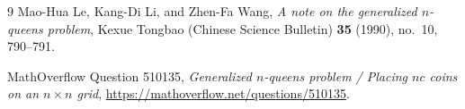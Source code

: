 \documentclass[11pt,a4paper]{article}
\theoremstyle{remark}
\begin{document}
\begin{thebibliography}{9}
Mao-Hua Le, Kang-Di Li, and Zhen-Fa Wang,
\emph{A note on the generalized $n$-queens problem},
Kexue Tongbao (Chinese Science Bulletin) \textbf{35} (1990), no.~10, 790--791.

MathOverflow Question 510135,
\emph{Generalized $n$-queens problem / Placing $nc$ coins on an $n \times n$ grid},
\url{https://mathoverflow.net/questions/510135}.
\end{thebibliography}
\end{document}
